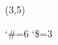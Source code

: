 %
%
%
%
%
%
%

\lhvercheck(3,5)




\message{\ligfile}
\immediate\openout\ligoutput\ligfile
\MakeHeadFileDefinition{}
\immediate\closeout\ligoutput

\catcode`\#=6  \catcode`\$=3

\endinput
%
